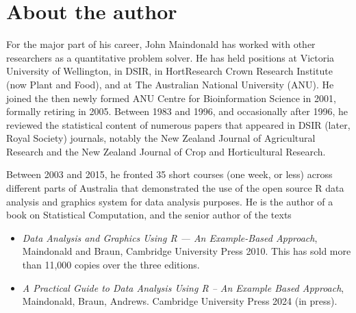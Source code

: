 \documentclass[
  10ptls,
  b5paper]{book}
\providecommand{\tightlist}{%
  \setlength{\itemsep}{0pt}\setlength{\parskip}{0pt}}
\begin{document}
\thispagestyle{empty}

\chapter*{About the author}\label{author}

For the major part of his career, John Maindonald has worked with other
researchers as a quantitative problem solver.
He has held positions at Victoria University of Wellington, in DSIR, in HortResearch Crown Research Institute (now Plant and Food), and at The Australian National University (ANU).
He joined the then newly formed ANU Centre for Bioinformation Science in 2001, formally retiring in 2005.
Between 1983 and 1996, and occasionally after 1996, he reviewed the statistical content of numerous papers that appeared in DSIR (later, Royal Society) journals, notably the New Zealand Journal of Agricultural Research and the New Zealand Journal of Crop and Horticultural Research.

Between 2003 and 2015, he fronted 35 short courses (one week, or less)
across different parts of Australia that demonstrated the use of the open source R data analysis and graphics system for data analysis purposes.
He is the author of a book on Statistical Computation, and the senior author of
the texts

\begin{itemize}
\tightlist
\item
  \emph{Data Analysis and Graphics Using R --- An Example-Based Approach}, Maindonald and Braun, Cambridge University Press 2010.
  This has sold more than 11,000 copies over the three editions.\\
\item
  \emph{A Practical Guide to Data Analysis Using R -- An Example Based Approach},
  Maindonald, Braun, Andrews. Cambridge University Press 2024 (in press).
\end{itemize}
\end{document}
